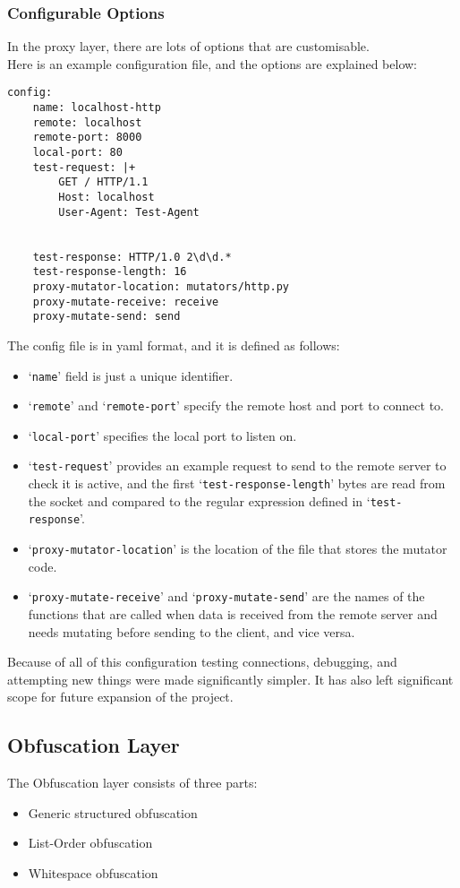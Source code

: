 \subsubsection{Configurable Options}
In the proxy layer, there are lots of options that are customisable.\\
Here is an example configuration file, and the options are explained below:
\begin{verbatim}
config:
    name: localhost-http
    remote: localhost
    remote-port: 8000
    local-port: 80
    test-request: |+
        GET / HTTP/1.1
        Host: localhost
        User-Agent: Test-Agent


    test-response: HTTP/1.0 2\d\d.*
    test-response-length: 16
    proxy-mutator-location: mutators/http.py
    proxy-mutate-receive: receive
    proxy-mutate-send: send
\end{verbatim}
The config file is in yaml format, and it is defined as follows:
\begin{itemize}
\item `\texttt{name}' field is just a unique identifier.
\item `\texttt{remote}' and `\texttt{remote-port}' specify the remote host and port to connect to.
\item `\texttt{local-port}' specifies the local port to listen on.
\item `\texttt{test-request}' provides an example request to send to the remote server to check it is active, and the first `\texttt{test-response-length}' bytes are read from the socket and compared to the regular expression defined in `\texttt{test-response}'.
\item `\texttt{proxy-mutator-location}' is the location of the file that stores the mutator code.
\item `\texttt{proxy-mutate-receive}' and `\texttt{proxy-mutate-send}' are the names of the functions that are called when data is received from the remote server and needs mutating before sending to the client, and vice versa.
\end{itemize}
Because of all of this configuration testing connections, debugging, and attempting new things were made significantly simpler. It has also left significant scope for future expansion of the project.

\subsection{Obfuscation Layer}
The Obfuscation layer consists of three parts:
\begin{itemize}
    \item Generic structured obfuscation
    \item List-Order obfuscation
    \item Whitespace obfuscation
\end{itemize}

